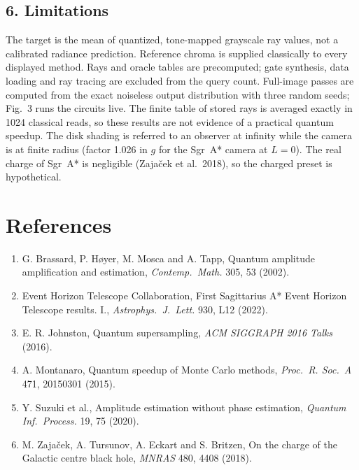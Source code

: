 \documentclass[11pt,twocolumn]{article}
\begin{document}
\subsection*{6. Limitations}
The target is the mean of quantized, tone-mapped grayscale ray values, not a calibrated radiance
prediction. Reference chroma is supplied classically to every displayed method. Rays and oracle
tables are precomputed; gate synthesis, data loading and ray tracing are excluded from the query
count. Full-image passes are computed from the exact noiseless output distribution with three random
seeds; Fig.~3 runs the circuits live. The finite table of stored rays is averaged exactly in 1024
classical reads, so these results are not evidence of a practical quantum speedup. The disk shading
is referred to an observer at infinity while the camera is at finite radius (factor 1.026 in $g$ for
the Sgr~A* camera at $L = 0$). The real charge of Sgr~A* is negligible (Zaja\v{c}ek et al.\ 2018),
so the charged preset is hypothetical.

\section*{References}
\begin{enumerate}\small
\item G. Brassard, P. H\o yer, M. Mosca and A. Tapp, Quantum amplitude amplification and estimation, \emph{Contemp.\ Math.} 305, 53 (2002).
\item Event Horizon Telescope Collaboration, First Sagittarius A* Event Horizon Telescope results. I., \emph{Astrophys.\ J.\ Lett.} 930, L12 (2022).
\item E. R. Johnston, Quantum supersampling, \emph{ACM SIGGRAPH 2016 Talks} (2016).
\item A. Montanaro, Quantum speedup of Monte Carlo methods, \emph{Proc.\ R. Soc.\ A} 471, 20150301 (2015).
\item Y. Suzuki et al., Amplitude estimation without phase estimation, \emph{Quantum Inf.\ Process.} 19, 75 (2020).
\item M. Zaja\v{c}ek, A. Tursunov, A. Eckart and S. Britzen, On the charge of the Galactic centre black hole, \emph{MNRAS} 480, 4408 (2018).
\end{enumerate}
\end{document}
